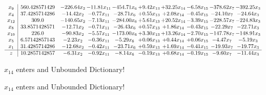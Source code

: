 \documentclass[9pt]{article}
\begin{document}
 \[\begin{array}{c| c c@{\hskip 2pt} c@{\hskip 2pt} c@{\hskip 2pt} c@{\hskip 2pt} c@{\hskip 2pt} c@{\hskip 2pt} c@{\hskip 2pt} c@{\hskip 2pt} }
 x_{9}   &  560.428571429 & -226.64 x_{2} & -11.81 x_{11} & -454.71 x_{6} & +  9.42 x_{13} & + 32.25 x_{14} & -6.58 x_{15} & -378.62 x_{7} & -392.25 x_{3}\\
 x_{4}   &  37.4285714286 & -14.42 x_{2} & -0.77 x_{11} & -28.71 x_{6} & +  0.55 x_{13} & +  2.08 x_{14} & -0.45 x_{15} & -24.10 x_{7} & -24.64 x_{3}\\
 x_{12}   &  309.0 & -140.65 x_{2} & -7.13 x_{11} & -284.00 x_{6} & +  5.61 x_{13} & + 20.52 x_{14} & -3.39 x_{15} & -228.57 x_{7} & -224.83 x_{3}\\
 x_{8}   &  33.8571428571 & -12.71 x_{2} & -0.71 x_{11} & -26.43 x_{6} & +  0.57 x_{13} & +  1.86 x_{14} & -0.43 x_{15} & -22.29 x_{7} & -22.71 x_{3}\\
 x_{10}   &  226.0 & -90.83 x_{2} & -5.57 x_{11} & -173.00 x_{6} & +  3.30 x_{13} & + 13.26 x_{14} & -2.70 x_{15} & -147.78 x_{7} & -148.91 x_{3}\\
 x_{5}   &  6.57142857143 & -2.23 x_{2} & -0.36 x_{11} & -5.29 x_{6} & +  0.06 x_{13} & +  0.44 x_{14} & +  0.06 x_{15} & -4.47 x_{7} & -5.19 x_{3}\\
 x_{1}   &  31.4285714286 & -12.68 x_{2} & -0.42 x_{11} & -23.71 x_{6} & +  0.59 x_{13} & +  1.69 x_{14} & -0.41 x_{15} & -19.93 x_{7} & -19.77 x_{3}\\
\hline
z    &  10.2857142857 & -6.31 x_{2} & -0.92 x_{11} & -8.14 x_{6} & -0.19 x_{13} & +  0.68 x_{14} & -0.19 x_{15} & -9.60 x_{7} & -11.44 x_{3}\\
\end{array}\]


 $ x_{14} $ enters and Unbounded Dictionary!


 $ x_{14} $ enters and Unbounded Dictionary!
\end{document}
